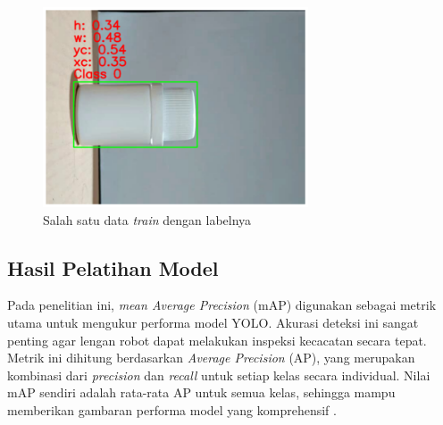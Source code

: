 \begin{figure}[H]
  \centering
  \includegraphics[width=0.7\textwidth]{gambar/anotasi.png}
  \caption{Salah satu data \textit{train} dengan labelnya}
  \label{fig:yolo-anotasi}
\end{figure}
\vspace{-1em}

\vspace{1em}

\subsection{Hasil Pelatihan Model}
Pada penelitian ini, \textit{mean Average Precision} (mAP) digunakan
sebagai metrik utama untuk mengukur performa model YOLO. Akurasi
deteksi ini sangat penting agar lengan robot dapat melakukan inspeksi
kecacatan secara tepat. Metrik ini dihitung berdasarkan
\textit{Average Precision} (AP), yang merupakan kombinasi dari
\textit{precision} dan \textit{recall} untuk setiap kelas secara
individual. Nilai mAP
sendiri adalah rata-rata AP untuk semua kelas, sehingga mampu
memberikan gambaran performa model yang komprehensif \citep{21}. \par

